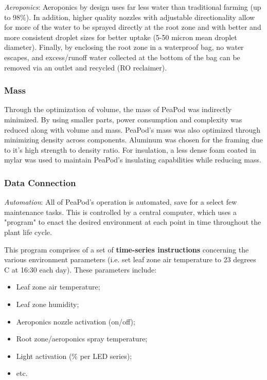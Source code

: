 \documentclass{report}
\begin{document}
\textit{Aeroponics}: Aeroponics by design uses far less water than traditional farming (up to 98\%). In addition, higher quality nozzles with adjustable directionality allow for more of the water to be sprayed directly at the root zone and with better and more consistent droplet sizes for better uptake (5-50 micron mean droplet diameter). Finally, by enclosing the root zone in a waterproof bag, no water escapes, and excess/runoff water collected at the bottom of the bag can be removed via an outlet and recycled (RO reclaimer).

\subsubsection{Mass} 
\label{sec:constraints-mass}

Through the optimization of volume, the mass of PeaPod was indirectly minimized. By using smaller parts, power consumption and complexity was reduced along with volume and mass. PeaPod's mass was also optimized through minimizing density across components. Aluminum was chosen for the framing due to it's high strength to density ratio. For insulation, a less dense foam coated in mylar was used to maintain PeaPod's insulating capabilities while reducing mass.

\subsubsection{Data Connection} 
\label{sec:constraints-data}



\textit{Automation}: All of PeaPod's operation is automated, save for a select few maintenance tasks. This is controlled by a central computer, which uses a "program" to enact the desired environment at each point in time throughout the plant life cycle. 

This program comprises of a set of \textbf{time-series instructions} concerning the various environment parameters (i.e. set leaf zone air temperature to 23 degrees C at 16:30 each day). These parameters include:
\begin{itemize}
    \item Leaf zone air temperature;
    \item Leaf zone humidity;
    \item Aeroponics nozzle activation (on/off);
    \item Root zone/aeroponics spray temperature;
    \item Light activation (\% per LED series);
    \item etc.
\end{itemize}
\end{document}
